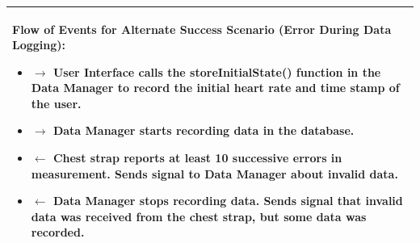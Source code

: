 \documentclass[letterpaper,english, 12pt]{scrreprt}
\begin{document}
\begin{center}
\begin{longtable}{|C{15cm}|}
\begin{itemize}
                                \end{itemize}
                        \begin{flushleft}
                                \textbf{Flow of Events for Alternate Success Scenario (Error During Data Logging): }
                        \end{flushleft}
                                \begin{itemize}
                                        \item $\rightarrow$ User Interface calls the storeInitialState() function in the Data Manager to record the initial heart rate and time stamp of the user.
                                        \item $\rightarrow$ Data Manager starts recording data in the database.
                                        \item $\leftarrow$ Chest strap reports at least 10 successive errors in measurement. Sends signal to Data Manager about invalid data.
                                        \item $\leftarrow$ Data Manager stops recording data. Sends signal that invalid data was received from the chest strap, but some data was recorded.
                                \end{itemize}
                                \\
                \hline
        \end{longtable}
\end{center}
\end{document}
